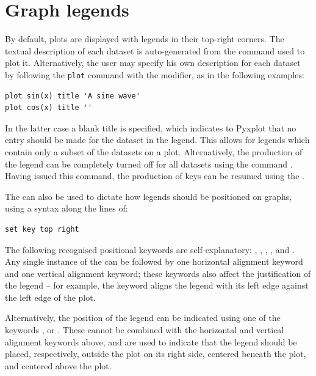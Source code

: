 \section{Graph legends}
\label{sec:legends}

By default, plots are displayed with legends in their top-right corners. The
textual description of each dataset is auto-generated from the command used
to plot it. Alternatively, the user may specify his own description for each
dataset by following the {\tt plot} command with the  modifier,
as in the following examples:

\begin{verbatim}
plot sin(x) title 'A sine wave'
plot cos(x) title ''
\end{verbatim}

In the latter case a blank title is specified, which indicates to Pyxplot that
no entry should be made for the dataset in the legend. This allows for legends
which contain only a subset of the datasets on a plot. Alternatively, the
production of the legend can be completely turned off for all datasets using
the command . Having issued this command, the production of
keys can be resumed using the .

The  can also be used to dictate how legends should be
positioned on graphs, using a syntax along the lines of:

\begin{verbatim}
set key top right
\end{verbatim}

The following recognised positional keywords are self-explanatory:
, , , ,
 and . Any single instance of the
 can be followed by one horizontal alignment keyword and one
vertical alignment keyword; these keywords also affect the justification of the
legend -- for example, the keyword  aligns the legend with its
left edge against the left edge of the plot.

Alternatively, the position of the legend can be indicated using one of the
keywords ,  or . These cannot be
combined with the horizontal and vertical alignment keywords above, and are
used to indicate that the legend should be placed, respectively, outside the
plot on its right side, centered beneath the plot, and centered above the plot.

